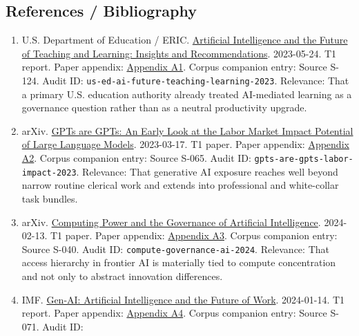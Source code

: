\documentclass[
  american,
  11pt,
  letterpaper,
]{article}
\providecommand{\tightlist}{%
  \setlength{\itemsep}{0pt}\setlength{\parskip}{0pt}}
\begin{document}
\subsection{References / Bibliography}\label{references-bibliography-9}

\begin{enumerate}
\def\labelenumi{\arabic{enumi}.}
\tightlist
\item
  U.S. Department of Education / ERIC.
  \href{https://eric.ed.gov/?id=ED631097}{Artificial Intelligence and
  the Future of Teaching and Learning: Insights and Recommendations}.
  2023-05-24. T1 report. Paper appendix:
  \hyperref[ch-09-appendix-a1-artificial-intelligence-and-the-future-of-teaching-and-learning-insights-and-recommendations]{Appendix
  A1}. Corpus companion entry: Source S-124. Audit ID:
  \texttt{us-ed-ai-future-teaching-learning-2023}. Relevance: That a
  primary U.S. education authority already treated AI-mediated learning
  as a governance question rather than as a neutral productivity
  upgrade.
\item
  arXiv. \href{https://arxiv.org/abs/2303.10130}{GPTs are GPTs: An Early
  Look at the Labor Market Impact Potential of Large Language Models}.
  2023-03-17. T1 paper. Paper appendix:
  \hyperref[ch-09-appendix-a2-gpts-are-gpts-an-early-look-at-the-labor-market-impact-potential-of-large-language-models]{Appendix
  A2}. Corpus companion entry: Source S-065. Audit ID:
  \texttt{gpts-are-gpts-labor-impact-2023}. Relevance: That generative
  AI exposure reaches well beyond narrow routine clerical work and
  extends into professional and white-collar task bundles.
\item
  arXiv. \href{https://arxiv.org/abs/2402.08797}{Computing Power and the
  Governance of Artificial Intelligence}. 2024-02-13. T1 paper. Paper
  appendix:
  \hyperref[ch-09-appendix-a3-computing-power-and-the-governance-of-artificial-intelligence]{Appendix
  A3}. Corpus companion entry: Source S-040. Audit ID:
  \texttt{compute-governance-ai-2024}. Relevance: That access hierarchy
  in frontier AI is materially tied to compute concentration and not
  only to abstract innovation differences.
\item
  IMF.
  \href{https://www.imf.org/en/publications/staff-discussion-notes/issues/2024/01/14/gen-ai-artificial-intelligence-and-the-future-of-work-542379}{Gen-AI:
  Artificial Intelligence and the Future of Work}. 2024-01-14. T1
  report. Paper appendix:
  \hyperref[ch-09-appendix-a4-gen-ai-artificial-intelligence-and-the-future-of-work]{Appendix
  A4}. Corpus companion entry: Source S-071. Audit ID:

\end{enumerate}
\end{document}
